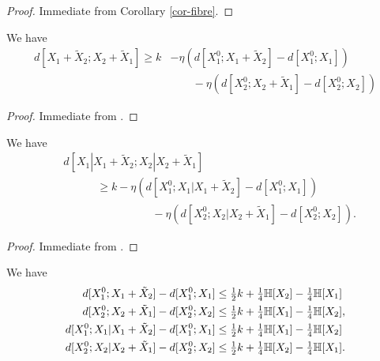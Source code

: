 \begin{proof} \leanok  Immediate from Corollary \ref{cor-fibre}.
\end{proof}

\begin{lemma}\label{first-dist-sum}
  \leanok
  We have
  \begin{align*}
    d[X_1+\tilde X_2; X_2+\tilde X_1] \geq k &- \eta (d[X^0_1; X_1+\tilde X_2] - d[X^0_1; X_1]) \\& \qquad- \eta (d[X^0_2; X_2+\tilde X_1] - d[X^0_2; X_2])
  \end{align*}
\end{lemma}


\begin{proof}\leanok Immediate from .
\end{proof}

\begin{lemma}\label{first-cond}
  \leanok
  We have
  \begin{align*}
    & d[X_1|X_1+\tilde X_2; X_2|X_2+\tilde X_1]  \\  & \qquad\quad \geq k - \eta (d[X^0_1; X_1 | X_1 + \tilde X_2] - d[X^0_1; X_1]) \\
    & \qquad\qquad\qquad\qquad  - \eta(d[X^0_2; X_2 | X_2 + \tilde X_1] - d[X^0_2; X_2]).
  \end{align*}
\end{lemma}

\begin{proof}\leanok Immediate from .
\end{proof}

\begin{lemma}\label{first-upper}\leanok
  We have
  \begin{align*}
    d[X^0_1; X_1+\tilde X_2] - d[X^0_1; X_1] &\leq \tfrac{1}{2} k + \tfrac{1}{4} \mathbb{H}[X_2] - \tfrac{1}{4} \mathbb{H}[X_1]\\
    d[X^0_2;X_2+\tilde X_1] - d[X^0_2; X_2] &\leq \tfrac{1}{2} k + \tfrac{1}{4} \mathbb{H}[X_1] - \tfrac{1}{4} \mathbb{H}[X_2], \\
    d[X_1^0;X_1|X_1+\tilde X_2] - d[X_1^0;X_1] &\leq \tfrac{1}{2} k + \tfrac{1}{4} \mathbb{H}[X_1] - \tfrac{1}{4} \mathbb{H}[X_2]  \\
    d[X_2^0; X_2|X_2+\tilde X_1] - d[X_2^0; X_2] &\leq \tfrac{1}{2}k + \tfrac{1}{4} \mathbb{H}[X_2] - \tfrac{1}{4} \mathbb{H}[X_1].
  \end{align*}
\end{lemma}

